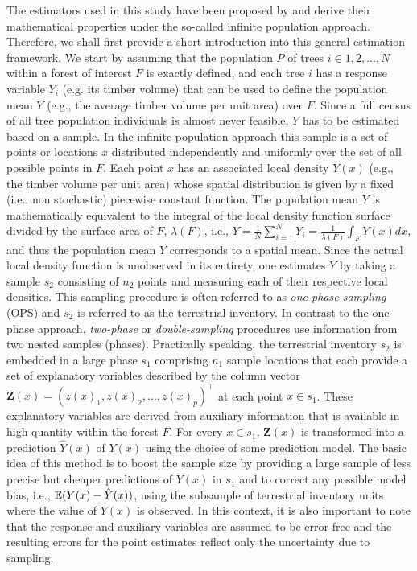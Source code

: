 The estimators used in this study have been proposed by \citep{mandallaz2013a,mandallaz2013b} and derive their mathematical properties under the so-called infinite population approach. Therefore, we shall first provide a short introduction into this general estimation framework. We start by assuming that the population $P$ of trees $i \in 1,2, ..., N$ within a forest of interest $F$ is exactly defined, and each tree $i$ has a response variable $Y_i$ (e.g. its timber volume) that can be used to define the population mean $Y$ (e.g., the average timber volume per unit area) over $F$. Since a full census of all tree population individuals is almost never feasible, $Y$ has to be estimated based on a sample. In the infinite population approach this sample is a set of points or locations $x$ distributed independently and uniformly over the set of all possible points in $F$. Each point $x$ has an associated local density $Y(x)$ (e.g., the timber volume per unit area) whose spatial distribution is given by a fixed (i.e., non stochastic) piecewise constant function. The population mean $Y$ is mathematically equivalent to the integral of the local density function surface divided by the surface area of $F$, $\lambda(F)$, i.e., $Y=\frac{1}{N} \sum_{i=1}^{N}Y_i=\frac{1}{\lambda(F)}\int_{F}Y(x)dx$, and thus the population mean $Y$ corresponds to a spatial mean. Since the actual local density function is unobserved in its entirety, one estimates $Y$ by taking a sample $s_2$ consisting of $n_2$ points and measuring each of their respective local densities. This sampling procedure is often referred to as \textit{one-phase sampling} (OPS) and $s_2$ is referred to as the terrestrial inventory. In contrast to the one-phase approach, \textit{two-phase} or \textit{double-sampling} procedures use information from two nested samples (phases). Practically speaking, the terrestrial inventory $s_2$ is embedded in a large phase $s_1$ comprising $n_1$ sample locations that each provide a set of explanatory variables described by the column vector $\pmb{Z}(x)=(z(x)_1, z(x)_2,...,z(x)_p)^{\top}$ at each point $x \in s_1$. These explanatory variables are derived from auxiliary information that is available in high quantity within the forest $F$. For every $x \in s_1$, $\pmb{Z}(x)$ is transformed into a prediction $\hat{Y}(x)$ of $Y(x)$ using the choice of some prediction model. The basic idea of this method is to boost the sample size by providing a large sample of less precise but cheaper predictions of $Y(x)$ in $s_1$ and to correct any possible model bias, i.e., $\mathbb{E}{(Y(x)-\hat{Y}(x))}$, using the subsample of terrestrial inventory units where the value of $Y(x)$ is observed. In this context, it is also important to note that the response and auxiliary variables are assumed to be error-free and the resulting errors for the point estimates reflect only the uncertainty due to sampling.

